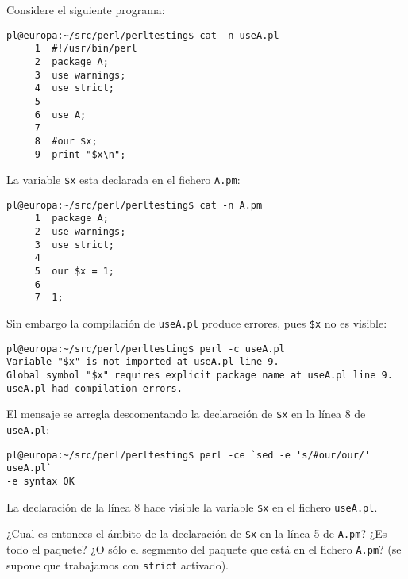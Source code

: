 \begin{exercise}
Considere el siguiente programa:
\begin{verbatim}
pl@europa:~/src/perl/perltesting$ cat -n useA.pl
     1  #!/usr/bin/perl
     2  package A;
     3  use warnings;
     4  use strict;
     5
     6  use A;
     7
     8  #our $x;
     9  print "$x\n";
\end{verbatim}
La variable \verb|$x| esta declarada en el fichero \verb|A.pm|:
\begin{verbatim}
pl@europa:~/src/perl/perltesting$ cat -n A.pm
     1  package A;
     2  use warnings;
     3  use strict;
     4
     5  our $x = 1;
     6
     7  1;
\end{verbatim}

Sin embargo la compilación de \verb|useA.pl| produce errores,
pues \verb|$x| no es visible:
\begin{verbatim}
pl@europa:~/src/perl/perltesting$ perl -c useA.pl
Variable "$x" is not imported at useA.pl line 9.
Global symbol "$x" requires explicit package name at useA.pl line 9.
useA.pl had compilation errors.
\end{verbatim}
El mensaje se arregla descomentando la declaración de \verb|$x|
en la línea 8 de \verb|useA.pl|:
\begin{verbatim}
pl@europa:~/src/perl/perltesting$ perl -ce `sed -e 's/#our/our/' useA.pl`
-e syntax OK
\end{verbatim}
La declaración de la línea 8 hace visible la variable \verb|$x| en el
fichero \verb|useA.pl|. 

¿Cual es entonces el ámbito de la declaración de \verb|$x| en la línea 5 de 
\verb|A.pm|? ¿Es todo el paquete? ¿O sólo el segmento del paquete que está en
el fichero \verb|A.pm|? (se supone que trabajamos con \verb|strict| activado).
\end{exercise}



